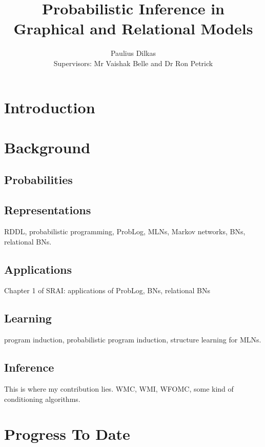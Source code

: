 \documentclass{article}
\title{Probabilistic Inference in Graphical and Relational Models}
\author{Paulius Dilkas \\[1ex] {\small Supervisors: Mr Vaishak Belle and Dr Ron
    Petrick}}
\affil{School of Informatics, University of Edinburgh}
\begin{document}
\maketitle

\section{Introduction} %

\section{Background} %

\subsection{Probabilities}
\subsection{Representations}
RDDL, probabilistic programming, ProbLog, MLNs, Markov networks, BNs, relational
BNs.
\subsection{Applications}
Chapter 1 of SRAI: applications of ProbLog, BNs, relational BNs
\subsection{Learning}
program induction, probabilistic program induction, structure learning for MLNs.
\subsection{Inference}
This is where my contribution lies. WMC, WMI, WFOMC, some kind of conditioning
algorithms.

\section{Progress To Date}
\end{document}
